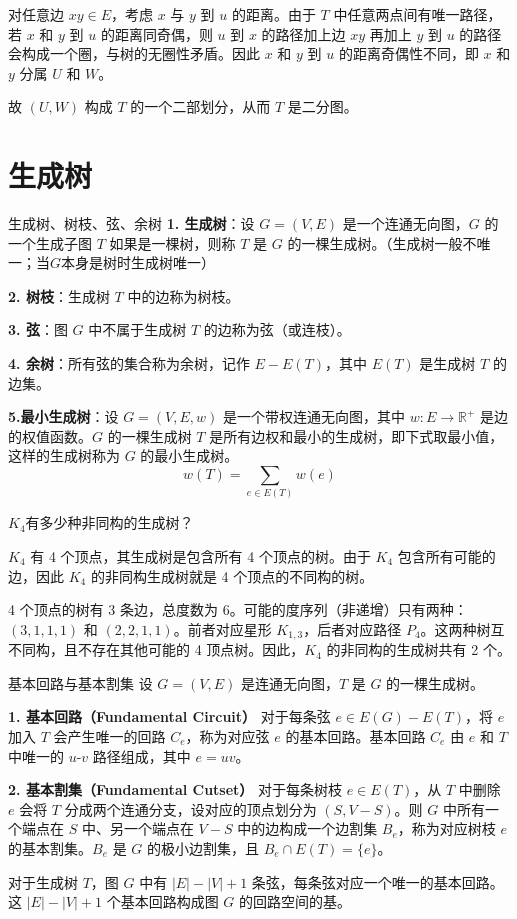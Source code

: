 对任意边 \(xy \in E\)，考虑 \(x\) 与 \(y\) 到 \(u\) 的距离。由于 \(T\) 中任意两点间有唯一路径，若 \(x\) 和 \(y\) 到 \(u\) 的距离同奇偶，则 \(u\) 到 \(x\) 的路径加上边 \(xy\) 再加上 \(y\) 到 \(u\) 的路径会构成一个圈，与树的无圈性矛盾。因此 \(x\) 和 \(y\) 到 \(u\) 的距离奇偶性不同，即 \(x\) 和 \(y\) 分属 \(U\) 和 \(W\)。

故 \((U, W)\) 构成 \(T\) 的一个二部划分，从而 \(T\) 是二分图。
\section{生成树}
\begin{definition}{生成树、树枝、弦、余树}{}
    \textbf{1. 生成树}：设 $G = (V, E)$ 是一个连通无向图，$G$ 的一个生成子图 $T$ 如果是一棵树，则称 $T$ 是 $G$ 的一棵生成树。（生成树一般不唯一；当$G$本身是树时生成树唯一）

    \textbf{2. 树枝}：生成树 $T$ 中的边称为树枝。

    \textbf{3. 弦}：图 $G$ 中不属于生成树 $T$ 的边称为弦（或连枝）。

    \textbf{4. 余树}：所有弦的集合称为余树，记作 $E - E(T)$，其中 $E(T)$ 是生成树 $T$ 的边集。

    \textbf{5.最小生成树}：设 $G=(V,E,w)$ 是一个带权连通无向图，其中 $w:E \to \mathbb{R}^+$ 是边的权值函数。$G$ 的一棵生成树 $T$ 是所有边权和最小的生成树，即下式取最小值，这样的生成树称为 $G$ 的最小生成树。
    \[
    w(T) = \sum_{e \in E(T)} w(e)
    \]
\end{definition}
\begin{example}{}{}
    $K_4$有多少种非同构的生成树？
\end{example}
$K_4$ 有 4 个顶点，其生成树是包含所有 4 个顶点的树。由于 $K_4$ 包含所有可能的边，因此 $K_4$ 的非同构生成树就是 4 个顶点的不同构的树。

4 个顶点的树有 3 条边，总度数为 6。可能的度序列（非递增）只有两种：$(3,1,1,1)$ 和 $(2,2,1,1)$。前者对应星形 $K_{1,3}$，后者对应路径 $P_4$。这两种树互不同构，且不存在其他可能的 4 顶点树。因此，$K_4$ 的非同构的生成树共有 2 个。
\begin{definition}{基本回路与基本割集}{}
设 $G=(V,E)$ 是连通无向图，$T$ 是 $G$ 的一棵生成树。

\textbf{1. 基本回路（Fundamental Circuit）}
对于每条弦 $e \in E(G)- E(T)$，将 $e$ 加入 $T$ 会产生唯一的回路 $C_e$，称为对应弦 $e$ 的基本回路。基本回路 $C_e$ 由 $e$ 和 $T$ 中唯一的 $u$-$v$ 路径组成，其中 $e=uv$。

\textbf{2. 基本割集（Fundamental Cutset）}
对于每条树枝 $e \in E(T)$，从 $T$ 中删除 $e$ 会将 $T$ 分成两个连通分支，设对应的顶点划分为 $(S, V- S)$。则 $G$ 中所有一个端点在 $S$ 中、另一个端点在 $V-S$ 中的边构成一个边割集 $B_e$，称为对应树枝 $e$ 的基本割集。$B_e$ 是 $G$ 的极小边割集，且 $B_e \cap E(T) = \{e\}$。
\end{definition}
对于生成树 $T$，图 $G$ 中有 $|E|-|V|+1$ 条弦，每条弦对应一个唯一的基本回路。这 $|E|-|V|+1$ 个基本回路构成图 $G$ 的回路空间的基。

